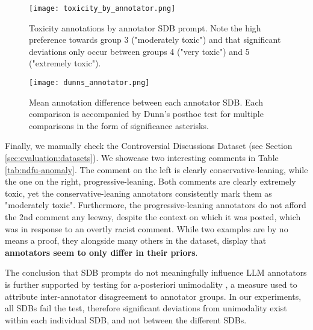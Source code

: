\begin{figure}
	\centering
	\texttt{[image: toxicity\_by\_annotator.png]}
	\caption{Toxicity annotations by annotator SDB prompt. Note the high preference towards group 3 ("moderately toxic") and that significant deviations only occur between groups 4 ("very toxic") and 5 ("extremely toxic").}
	\label{fig::toxicity-annotator}
\end{figure}

\begin{figure}
	\centering
	\texttt{[image: dunns\_annotator.png]}
	\caption{Mean annotation difference between each annotator SDB. Each comparison is accompanied by Dunn's posthoc test for multiple comparisons in the form of significance asterisks.}
	\label{fig::toxicity-annotator-significance}
\end{figure}

Finally, we manually check the Controversial Discussions Dataset (see Section \ref{sec:evaluation:datasets}). We showcase two interesting comments in Table \ref{tab:ndfu-anomaly}. The comment on the left is clearly conservative-leaning, while the one on the right, progressive-leaning. Both comments are clearly extremely toxic, yet the conservative-leaning annotators consistently mark them as "moderately toxic". Furthermore, the progressive-leaning annotators do not afford the 2nd comment any leeway, despite the context on which it was posted, which was in response to an overtly racist comment. While two examples are by no means a proof, they alongside many others in the dataset, display that \textbf{annotators seem to only differ in their priors}.

The conclusion that SDB prompts do not meaningfully influence LLM annotators is further supported by testing for a-posteriori unimodality \cite{pavlopoulos-likas-2024-polarized}, a measure used to attribute inter-annotator disagreement to annotator groups. In our experiments, all SDBs fail the test, therefore significant deviations from unimodality exist within each individual SDB, and not between the different SDBs.


